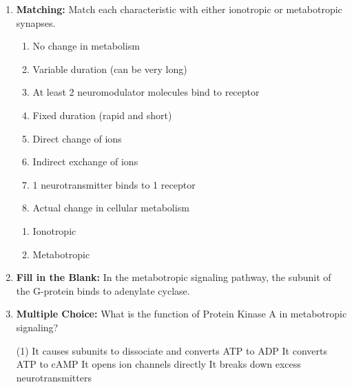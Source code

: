 \begin{enumerate}[label=\textbf{Q2.5.\arabic*}]
      \item \textbf{Matching:} Match each characteristic with either ionotropic or metabotropic synapses.
            \begin{wordbox}
                  \begin{enumerate}[label=(\alph*)]
                        \item No change in metabolism
                        \item Variable duration (can be very long)
                        \item At least 2 neuromodulator molecules bind to receptor
                        \item Fixed duration (rapid and short)
                        \item Direct change of ions
                        \item Indirect exchange of ions
                        \item 1 neurotransmitter binds to 1 receptor
                        \item Actual change in cellular metabolism
                  \end{enumerate}
            \end{wordbox}
            \begin{enumerate}[label=(\arabic*)]
                  \item Ionotropic \quad \dotfill \quad \underline{\hspace{3cm}} \\ 
                  \item Metabotropic \quad \dotfill \quad \underline{\hspace{3cm}} \\
            \end{enumerate}
                        
      \item \textbf{Fill in the Blank:} In the metabotropic signaling pathway, the \underline{\hspace{3cm}} subunit of the G-protein binds to adenylate cyclase. \\
            
      \item \textbf{Multiple Choice:} What is the function of Protein Kinase A in metabotropic signaling?
            \begin{tasks}[label=(\Alph*), label-width=1.5em, item-indent=1.7em](1)
                  \task It causes subunits to dissociate and converts ATP to ADP
                  \task It converts ATP to cAMP
                  \task It opens ion channels directly
                  \task It breaks down excess neurotransmitters
            \end{tasks}
            

\end{enumerate}
